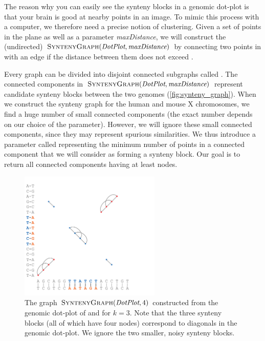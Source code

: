 The reason why you can easily see the synteny blocks in a genomic dot-plot is that your brain is good at  nearby points in an image.  To mimic this process with a computer, we therefore need a precise notion of clustering. Given a set of points  in the plane as well as a parameter \textit{maxDistance}, we will construct the (undirected)  $\text{\scshape SyntenyGraph}(\textit{DotPlot}, \textit{maxDistance})$ by connecting two points in  with an edge if the distance between them does not exceed .

Every graph can be divided into disjoint connected subgraphs called .  The connected components in $\text{\scshape SyntenyGraph}(\textit{DotPlot}, \textit{maxDistance})$ represent candidate synteny blocks between the two genomes (\autoref{fig:synteny_graph}).  When we construct the synteny graph for the human and mouse X chromosomes, we find a huge number of small connected components (the exact number depends on our choice of the  parameter). However, we will ignore these small connected components, since they may represent spurious similarities. We thus introduce a parameter called  representing the minimum number of points in a connected component that we will consider as forming a synteny block.  Our goal is to return all connected components having at least  nodes.\\

\begin{figure}[h]
\mySfFamily
\centering
\includegraphics[width = 0.6\textwidth]{images/rearrangements/synteny_graph}
\caption{The graph $\text{\scshape SyntenyGraph}(\textit{DotPlot}, 4)$ constructed from the genomic dot-plot of  and   for $k = 3$.  Note that the three synteny blocks (all of which have four nodes) correspond to diagonals in the genomic dot-plot.  We ignore the two smaller, noisy synteny blocks.}
\label{fig:synteny_graph}
\end{figure}

